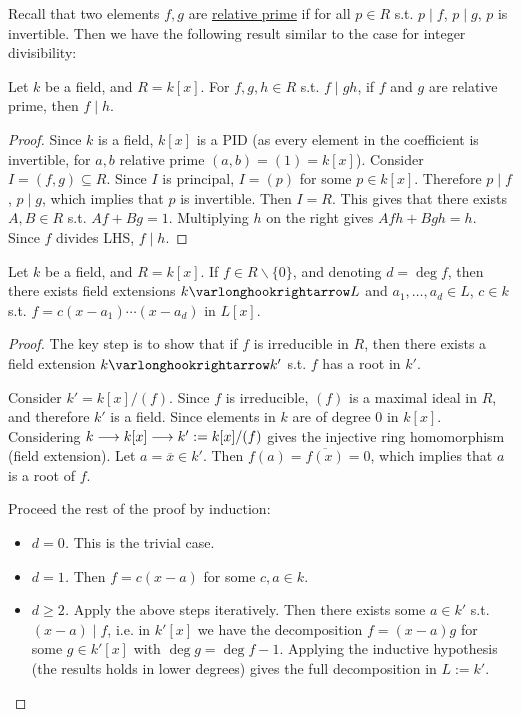 \documentclass{article}
\begin{document}
\textstart
Recall that two elements $f, g$ are \underline{relative prime} if for all $p \in R$ s.t. $p \mid f$, $p \mid g$, $p$ is invertible. Then we have the following result similar to the case for integer divisibility:

\begin{proposition}\label{prop: divisibility for relative prime polynomials}
    Let $k$ be a field, and $R = k[x]$. For $f, g, h \in R$ s.t. $f \mid gh$, if $f$ and $g$ are relative prime, then $f \mid h$.
\end{proposition}

\begin{proof}
    Since $k$ is a field, $k[x]$ is a PID (as every element in the coefficient is invertible, for $a, b$ relative prime $(a, b) = (1) = k[x]$). Consider $I = (f, g) \subseteq R$. Since $I$ is principal, $I = (p)$ for some $p \in k[x]$. Therefore $p \mid f$, $p \mid g$, which implies that $p$ is invertible. Then $I = R$. This gives that there exists $A, B \in R$ s.t. $Af + Bg = 1$. Multiplying $h$ on the right gives $Afh + Bgh = h$. Since $f$ divides LHS, $f \mid h$.
\end{proof}

\begin{proposition}
    Let $k$ be a field, and $R = k[x]$. If $f \in R \smallsetminus \{0\}$, and denoting $d = \deg f$, then there exists field extensions $k \ext L$ and $a_1, \dots, a_d \in L$, $c \in k$ s.t. $f = c(x - a_1)\cdots (x - a_d)$ in $L[x]$.
\end{proposition}

\begin{proof}
    The key step is to show that if $f$ is irreducible in $R$, then there exists a field extension $k \ext k'$ s.t. $f$ has a root in $k'$.

    Consider $k' = k[x]/(f)$. Since $f$ is irreducible, $(f)$ is a maximal ideal in $R$, and therefore $k'$ is a field. Since elements in $k$ are of degree 0 in $k[x]$. Considering $k \longrightarrow k[x] \longrightarrow k' := k[x]/(f)$ gives the injective ring homomorphism (field extension). Let $a = \overline{x} \in k'$. Then $f(a) = \overline{f(x)} = 0$, which implies that $a$ is a root of $f$.

    Proceed the rest of the proof by induction: 
    \begin{itemize}
        \item \emph{$d = 0$.} This is the trivial case.
        \item \emph{$d = 1$.} Then $f = c(x - a)$ for some $c, a \in k$.
        \item \emph{$d \geq 2$.} Apply the above steps iteratively. Then there exists some $a \in k'$ s.t. $(x - a) \mid f$, i.e. in $k'[x]$ we have the decomposition $f = (x - a) g$ for some $g \in k'[x]$ with $\deg g = \deg f - 1$. Applying the inductive hypothesis (the results holds in lower degrees) gives the full decomposition in $L := k'$. 
    \end{itemize}
\end{proof}
\end{document}
